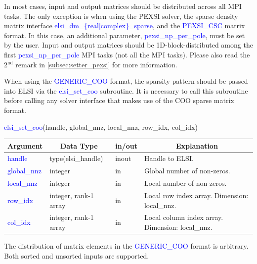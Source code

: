 \documentclass{report}
\newcommand{\tcb}[1]{\textcolor{blue}{#1}}
\begin{document}
In most cases, input and output matrices should be distributed across all MPI tasks. The only exception is when using the PEXSI solver, the sparse density matrix interface \tcb{elsi\_dm\_\{real$\vert$complex\}\_sparse}, and the \tcb{PEXSI\_CSC} matrix format. In this case, an additional parameter, \tcb{pexsi\_np\_per\_pole}, must be set by the user. Input and output matrices should be 1D-block-distributed among the first \tcb{pexsi\_np\_per\_pole} MPI tasks (not all the MPI tasks). Please also read the 2$^\text{nd}$ remark in \ref{subsec:setter_pexsi} for more information.

When using the \tcb{GENERIC\_COO} format, the sparsity pattern should be passed into ELSI via the \tcb{elsi\_set\_coo} subroutine. It is necessary to call this subroutine before calling any solver interface that makes use of the COO sparse matrix format.
\begin{labeling}{\hspace{6cm}}
\item [\hspace{0.3cm} \tcb{elsi\_set\_coo}(handle, global\_nnz, local\_nnz, row\_idx, col\_idx)]
\end{labeling}

\begin{tabular}[]{|p{30mm}|p{35mm}|p{15mm}|p{85mm}|}
\hline
\multicolumn{1}{|c|}{\textbf{Argument}} & \multicolumn{1}{c|}{\textbf{Data Type}} & \multicolumn{1}{c|}{\textbf{in/out}} & \multicolumn{1}{c|}{\textbf{Explanation}}\\
\hline
\tcb{handle}      & type(elsi\_handle)    & inout & Handle to ELSI.\\
\hline
\tcb{global\_nnz} & integer               & in    & Global number of non-zeros.\\
\hline
\tcb{local\_nnz}  & integer               & in    & Local number of non-zeros.\\
\hline
\tcb{row\_idx}    & integer, rank-1 array & in    & Local row index array. Dimension: local\_nnz.\\
\hline
\tcb{col\_idx}    & integer, rank-1 array & in    & Local column index array. Dimension: local\_nnz.\\
\hline
\end{tabular}

The distribution of matrix elements in the \tcb{GENERIC\_COO} format is arbitrary. Both sorted and unsorted inputs are supported.
\end{document}
